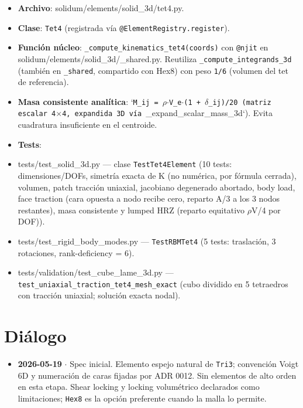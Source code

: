 \documentclass[11pt,letterpaper,oneside]{report}
\begin{document}
\begin{itemize}
  \item \textbf{Archivo}: solidum/elements/solid\_3d/tet4.py.
  \item \textbf{Clase}: \texttt{Tet4} (registrada vía \texttt{@ElementRegistry.register}).
  \item \textbf{Función núcleo}: \texttt{\_compute\_kinematics\_tet4(coords)} con \texttt{@njit} en solidum/elements/solid\_3d/\_shared.py. Reutiliza \texttt{\_compute\_integrands\_3d} (también en \texttt{\_shared}, compartido con Hex8) con peso \texttt{1/6} (volumen del tet de referencia).
  \item \textbf{Masa consistente analítica}: `\texttt{M\_ij = \ensuremath{\rho}\ensuremath{\cdot}V\_e\ensuremath{\cdot}(1 + \ensuremath{\delta}\_ij)/20}\texttt{ (matriz escalar 4\ensuremath{\times}4, expandida 3D vía }\_expand\_scalar\_mass\_3d`). Evita cuadratura insuficiente en el centroide.
  \item \textbf{Tests}:
  \item tests/test\_solid\_3d.py --- clase \texttt{TestTet4Element} (10 tests: dimensiones/DOFs, simetría exacta de K (no numérica, por fórmula cerrada), volumen, patch tracción uniaxial, jacobiano degenerado abortado, body load, face traction (cara opuesta a nodo recibe cero, reparto A/3 a los 3 nodos restantes), masa consistente y lumped HRZ (reparto equitativo \ensuremath{\rho}V/4 por DOF)).
  \item tests/test\_rigid\_body\_modes.py --- \texttt{TestRBMTet4} (5 tests: traslación, 3 rotaciones, rank-deficiency = 6).
  \item tests/validation/test\_cube\_lame\_3d.py --- \texttt{test\_uniaxial\_traction\_tet4\_mesh\_exact} (cubo dividido en 5 tetraedros con tracción uniaxial; solución exacta nodal).
\end{itemize}


\section{Diálogo}

\begin{itemize}
  \item \textbf{2026-05-19} \ensuremath{\cdot} Spec inicial. Elemento espejo natural de \texttt{Tri3}; convención Voigt 6D y numeración de caras fijadas por ADR 0012. Sin elementos de alto orden en esta etapa. Shear locking y locking volumétrico declarados como limitaciones; \texttt{Hex8} es la opción preferente cuando la malla lo permite.
\end{itemize}
\end{document}
